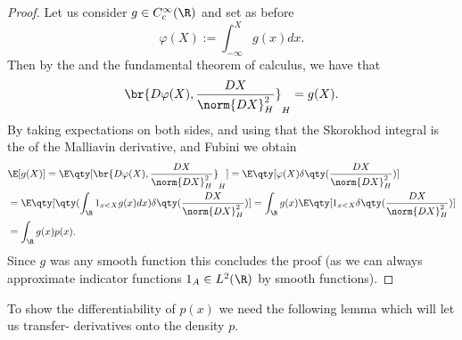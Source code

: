 \documentclass[
    a4paper,
    DIV=14,
    abstract=true,
    numbers=noenddot
]{scrartcl}
\begin{document}
	\begin{proof}
		Let us consider $g\in C_c^\infty(\R)$ and set as before
		\begin{equation*}
			\varphi(X):=\int_{-\infty}^X g(x)dx.
		\end{equation*}
		Then by the  and the fundamental theorem of calculus, we have that
		\begin{equation*}
			\br{D\varphi(X),\frac{DX}{\norm{DX}^2_{H}}}_{H}=g(X).
		\end{equation*}
		By taking expectations on both sides, and using that the Skorokhod integral is the  of the Malliavin derivative, and Fubini we obtain
		\begin{align*}
			 & \E[g(X)]=\E\qty[\br{D\varphi(X),\frac{DX}{\norm{DX}^2_{H}}}_{H}]=\E\qty[\varphi(X)\delta\qty(\frac{DX}{\norm{DX}_{H}^2})]                                 \\
			 & =\E\qty[\qty(\int_{\R}1_{x<X} g(x)dx)\delta\qty(\frac{DX}{\norm{DX}^2_{H}})]=\int_{\R}g(x)\E\qty[1_{x<X}\delta \qty(\frac{DX}{\norm{DX}_{H}^2}) ] \\&=\int_{\R}g(x)p(x).
		\end{align*}
		Since $g$ was any smooth function this concludes the proof (as we can always approximate indicator functions $1_A\in L^2(\R)$ by smooth functions).
	\end{proof}
	To show the differentiability of $p(x)$ we need the following lemma which will let us transfer- derivatives onto the density $p$.
\end{document}
